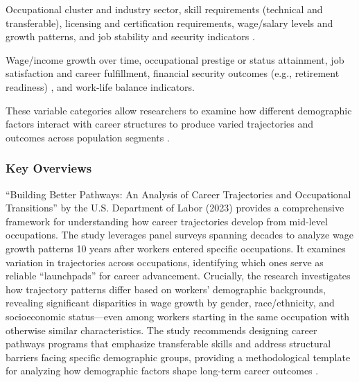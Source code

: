 \documentclass[../main.tex]{subfiles}
\begin{document}
 Occupational cluster and industry sector, skill requirements (technical and transferable), licensing and certification requirements, wage/salary levels and growth patterns, and job stability and security indicators \citep{dol2023building}.

 Wage/income growth over time, occupational prestige or status attainment, job satisfaction and career fulfillment, financial security outcomes (e.g., retirement readiness) \citep{lee2023middle}, and work-life balance indicators.

These variable categories allow researchers to examine how different demographic factors interact with career structures to produce varied trajectories and outcomes across population segments \citep{questionpro2024demographic}.

\subsubsection{Key Overviews}

 ``Building Better Pathways: An Analysis of Career Trajectories and Occupational Transitions'' by the U.S. Department of Labor (2023) provides a comprehensive framework for understanding how career trajectories develop from mid-level occupations. The study leverages panel surveys spanning decades to analyze wage growth patterns 10 years after workers entered specific occupations. It examines variation in trajectories across occupations, identifying which ones serve as reliable ``launchpads'' for career advancement. Crucially, the research investigates how trajectory patterns differ based on workers' demographic backgrounds, revealing significant disparities in wage growth by gender, race/ethnicity, and socioeconomic status—even among workers starting in the same occupation with otherwise similar characteristics. The study recommends designing career pathways programs that emphasize transferable skills and address structural barriers facing specific demographic groups, providing a methodological template for analyzing how demographic factors shape long-term career outcomes \citep{dol2023building}.
\end{document}
